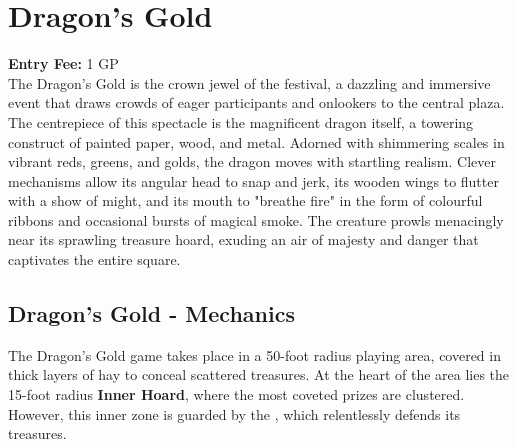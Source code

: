 \section*{Dragon's Gold}
\textbf{Entry Fee:} 1 GP\\
{\entryfont The Dragon's Gold is the crown jewel of the festival, a dazzling and immersive event that draws crowds of eager participants and onlookers to the central plaza. The centrepiece of this spectacle is the magnificent dragon itself, a towering construct of painted paper, wood, and metal. Adorned with shimmering scales in vibrant reds, greens, and golds, the dragon moves with startling realism. Clever mechanisms allow its angular head to snap and jerk, its wooden wings to flutter with a show of might, and its mouth to "breathe fire" in the form of colourful ribbons and occasional bursts of magical smoke. The creature prowls menacingly near its sprawling treasure hoard, exuding an air of majesty and danger that captivates the entire square.}

\subsection*{Dragon's Gold - Mechanics}
{\entryfont The Dragon's Gold game takes place in a 50-foot radius playing area, covered in thick layers of hay to conceal scattered treasures. At the heart of the area lies the 15-foot radius \textbf{Inner Hoard}, where the most coveted prizes are clustered. However, this inner zone is guarded by the \hyperref[monster:FestivalDragon]{}, which relentlessly defends its treasures.}

